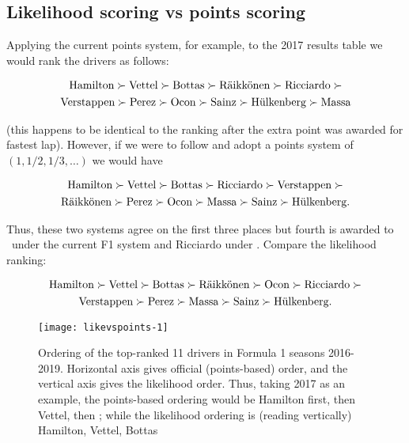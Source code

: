 \documentclass{elsarticle}
\begin{document}
\subsection{Likelihood scoring vs points
scoring}\label{likelihood-scoring-vs-points-scoring}

Applying the current points system, for example, to the 2017 results
table we would rank the drivers as follows:

\begin{multline}\nonumber
\mbox{Hamilton}\succ
\mbox{Vettel}\succ
\mbox{Bottas}\succ
\mbox{R\"{a}ikk\"{o}nen}\succ
\mbox{Ricciardo}\succ\\
\mbox{Verstappen}\succ
\mbox{Perez}\succ
\mbox{Ocon}\succ
\mbox{Sainz}\succ
\mbox{H\"{u}lkenberg}\succ
\mbox{Massa}
\end{multline}

\noindent (this happens to be identical to the ranking after the extra
point was awarded for fastest lap).  However, if we were to follow
\citet{zipf1949} and adopt a points system of $(1,1/2,1/3,\ldots)$ we
would have

\begin{multline}\nonumber
\mbox{Hamilton}\succ
\mbox{Vettel}\succ
\mbox{Bottas}\succ
\mbox{Ricciardo}\succ
\mbox{Verstappen}\succ\\
\mbox{R\"{a}ikk\"{o}nen}\succ
\mbox{Perez}\succ
\mbox{Ocon}\succ
\mbox{Massa}\succ
\mbox{Sainz}\succ
\mbox{H\"{u}lkenberg}.
\end{multline}

\noindent Thus, these two systems agree on the first three places but
fourth is awarded to \raik\ under the current F1 system and Ricciardo
under \citeauthor{zipf1949}.  Compare the likelihood ranking:

\begin{multline}\nonumber
\mbox{Hamilton}\succ
\mbox{Vettel}\succ
\mbox{Bottas}\succ
\mbox{R\"{a}ikk\"{o}nen}\succ
\mbox{Ocon}\succ
\mbox{Ricciardo}\succ\\
\mbox{Verstappen}\succ
\mbox{Perez}\succ
\mbox{Massa}\succ
\mbox{Sainz}\succ
\mbox{H\"{u}lkenberg}.
\end{multline}

\begin{figure}
{\centering \texttt{[image: likevspoints-1]}}
\caption{\doublespacing Ordering of
  the \label{orderingbypointsandlikelihood} top-ranked 11 drivers in
  Formula 1 seasons 2016-2019.  Horizontal axis gives official
  (points-based) order, and the vertical axis gives the likelihood
  order.  Thus, taking 2017 as an example, the points-based ordering
  would be Hamilton first, then Vettel, then \raik; while the
  likelihood ordering is (reading vertically) Hamilton, Vettel, Bottas
}\label{fig:likevspoints}
\end{figure}
\end{document}
